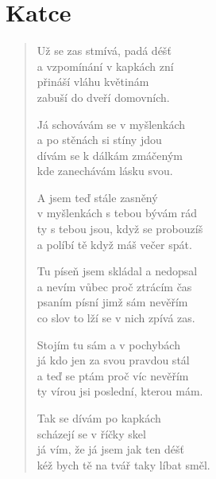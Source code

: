\section{Katce}

\begin{verse}
Už se zas stmívá, padá déšť \\
a vzpomínání v kapkách zní \\
přináší vláhu květinám \\
zabuší do dveří domovních.

Já schovávám se v myšlenkách \\
a po stěnách si stíny jdou \\
dívám se k dálkám zmáčeným \\
kde zanechávám lásku svou.

A jsem teď stále zasněný \\
v myšlenkách s tebou bývám rád \\
ty s tebou jsou, když se probouzíš \\
a políbí tě když máš večer spát.

Tu píseň jsem skládal a nedopsal \\
a nevím vůbec proč ztrácím čas \\
psaním písní jimž sám nevěřím \\
co slov to lží se v nich zpívá zas.

Stojím tu sám a v pochybách \\
já kdo jen za svou pravdou stál \\
a teď se ptám proč víc nevěřím \\
ty vírou jsi poslední, kterou mám.

Tak se dívám po kapkách \\
scházejí se v říčky skel \\
já vím, že já jsem jak ten déšť \\
kéž bych tě na tvář taky líbat směl.



\end{verse}
